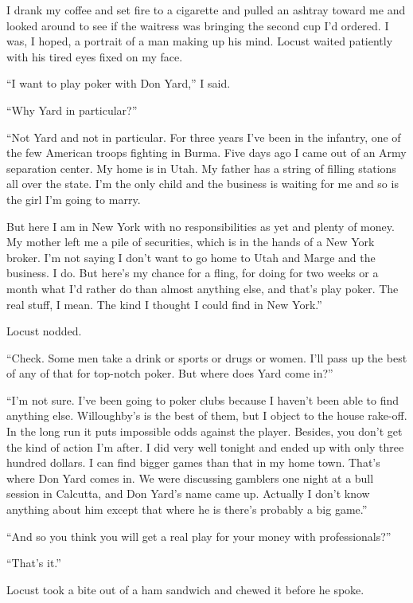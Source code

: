 \documentclass{novel}
\begin{document}
\scenestars

I drank my coffee and set fire to a cigarette and pulled an ashtray toward me and looked around to see if the waitress was bringing the second cup I’d ordered. I was, I hoped, a portrait of a man making up his mind. Locust waited patiently with his tired eyes fixed on my face.

“I want to play poker with Don Yard,” I said.

“Why Yard in particular?”

“Not Yard and not in particular. For three years I’ve been in the infantry, one of the few American troops fighting in Burma. Five days ago I came out of an Army separation center. My home is in Utah. My father has a string of filling stations all over the state. I’m the only child and the business is waiting for me and so is the girl I’m going to marry.

But here I am in New York with no responsibilities as yet and plenty of money. My mother left me a pile of securities, which is in the hands of a New York broker. I’m not saying I don’t want to go home to Utah and Marge and the business. I do. But here’s my chance for a fling, for doing for two weeks or a month what I’d rather do than almost anything else, and that’s play poker. The real stuff, I mean. The kind I thought I could find in New York.”

Locust nodded.

“Check. Some men take a drink or sports or drugs or women. I’ll pass up the best of any of that for top-notch poker. But where does Yard come in?”

“I’m not sure. I’ve been going to poker clubs because I haven’t been able to find anything else. Willoughby’s is the best of them, but I object to the house rake-off. In the long run it puts impossible odds against the player. Besides, you don’t get the kind of action I’m after. I did very well tonight and ended up with only three hundred dollars. I can find bigger games than that in my home town. That’s where Don Yard comes in. We were discussing gamblers one night at a bull session in Calcutta, and Don Yard’s name came up. Actually I don’t know anything about him except that where he is there’s probably a big game.”

“And so you think you will get a real play for your money with professionals?”

“That’s it.”

Locust took a bite out of a ham sandwich and chewed it before he spoke. 
\end{document}
